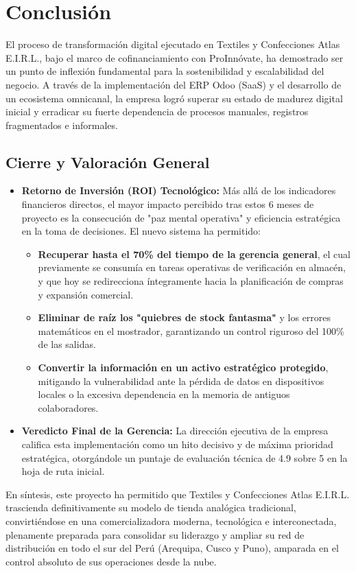 \section{Conclusión}

El proceso de transformación digital ejecutado en Textiles y Confecciones Atlas E.I.R.L., bajo el marco de cofinanciamiento con ProInnóvate, ha demostrado ser un punto de inflexión fundamental para la sostenibilidad y escalabilidad del negocio. A través de la implementación del ERP Odoo (SaaS) y el desarrollo de un ecosistema omnicanal, la empresa logró superar su estado de madurez digital inicial y erradicar su fuerte dependencia de procesos manuales, registros fragmentados e informales.

\subsection{Cierre y Valoración General}

\begin{itemize}
    \item \textbf{Retorno de Inversión (ROI) Tecnológico:} Más allá de los indicadores financieros directos, el mayor impacto percibido tras estos 6 meses de proyecto es la consecución de "paz mental operativa" y eficiencia estratégica en la toma de decisiones. El nuevo sistema ha permitido:
    \begin{itemize}
        \item \textbf{Recuperar hasta el 70\% del tiempo de la gerencia general}, el cual previamente se consumía en tareas operativas de verificación en almacén, y que hoy se redirecciona íntegramente hacia la planificación de compras y expansión comercial.
        \item \textbf{Eliminar de raíz los "quiebres de stock fantasma"} y los errores matemáticos en el mostrador, garantizando un control riguroso del 100\% de las salidas.
        \item \textbf{Convertir la información en un activo estratégico protegido}, mitigando la vulnerabilidad ante la pérdida de datos en dispositivos locales o la excesiva dependencia en la memoria de antiguos colaboradores.
    \end{itemize}
    \item \textbf{Veredicto Final de la Gerencia:} La dirección ejecutiva de la empresa califica esta implementación como un hito decisivo y de máxima prioridad estratégica, otorgándole un puntaje de evaluación técnica de 4.9 sobre 5 en la hoja de ruta inicial. 
\end{itemize}

En síntesis, este proyecto ha permitido que Textiles y Confecciones Atlas E.I.R.L. trascienda definitivamente su modelo de tienda analógica tradicional, convirtiéndose en una comercializadora moderna, tecnológica e interconectada, plenamente preparada para consolidar su liderazgo y ampliar su red de distribución en todo el sur del Perú (Arequipa, Cusco y Puno), amparada en el control absoluto de sus operaciones desde la nube.
